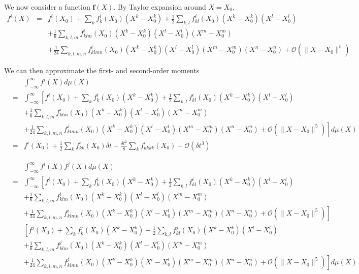 \documentclass[12pt]{article}
\begin{document}
We now consider a function $\mathbf{f}(X)$.
%
By Taylor expansion around $X=X_0$,
\begin{eqnarray}
f^i(X) &=& 
f^i(X_0) 
+ \sum_k f^i_k(X_0)  (X^k-X^k_0) 
+\frac{1}{2} \sum_{k,l}  f^i_{kl} (X_0) (X^k-X_0^k) (X^l-X_0^l) \\
&& + \frac{1}{6} \sum_{k,l,m} f^i_{klm} (X_0) (X^k-X_0^k) (X^l-X_0^l) (X^m-X_0^m) \\
&& + \frac{1}{24} \sum_{k,l,m,n} f^i_{klmn} (X_0) (X^k-X_0^k) (X^l-X_0^l) (X^m-X_0^m) (X^n-X_0^n)
+ \mathcal{O}\left( \| X- X_0 \|^5 \right)
\end{eqnarray}

We can then approximate the first- and second-order moments 
\begin{eqnarray}
&&\int_{-\infty}^{\infty} f^i(X) d\mu(X) \\
&= & \int_{-\infty}^{\infty} \left[ f^i(X_0) + \sum_k f^i_k(X_0) (X^k-X_0^k)  + \frac{1}{2} \sum_{k,l} f^i_{kl}(X_0) (X^k-X_0^k) (X^l-X_0^l)  \right. \\
&& + \frac{1}{6} \sum_{k,l,m} f^i_{klm} (X_0) (X^k-X_0^k) (X^l-X_0^l) (X^m-X_0^m) \\
&& \left. + \frac{1}{24} \sum_{k,l,m,n} f^i_{klmn} (X_0) (X^k-X_0^k) (X^l-X_0^l) (X^m-X_0^m) (X^n-X_0^n)
+ \mathcal{O}\left( \| X- X_0 \|^5 \right) \right] d\mu(X) \\
&=& f^i(X_0) + \frac{1}{2} \sum_k f^i_{kk}(X_0) \delta t + \frac{\delta t^2}{8} \sum_{k} f^i_{kkkk} (X_0) + \mathcal{O} (\delta t^3 )
\end{eqnarray}

\begin{eqnarray}
&&\int_{-\infty}^{\infty} f^i(X) f^j(X) d\mu(X) \\
&= &
\int_{-\infty}^{\infty} \left[ f^i(X_0) + \sum_k f^i_k(X_0) (X^k-X_0^k)  + \frac{1}{2} \sum_{k,l} f^i_{kl}(X_0) (X^k-X_0^k) (X^l-X_0^l) \right. \\
&&  + \frac{1}{6} \sum_{k,l,m} f^i_{klm} (X_0) (X^k-X_0^k) (X^l-X_0^l) (X^m-X_0^m) \\
&& \left. + \frac{1}{24} \sum_{k,l,m,n} f^i_{klmn} (X_0) (X^k-X_0^k) (X^l-X_0^l) (X^m-X_0^m) (X^n-X_0^n)
+ \mathcal{O}\left( \| X- X_0 \|^5 \right) \right]  \\
&& \left[ f^j(X_0) + \sum_k f^j_k(X_0) (X^k-X_0^k)  + \frac{1}{2} \sum_{k,l} f^j_{kl}(X_0) (X^k-X_0^k) (X^l-X_0^l)  \right. \\
&&  + \frac{1}{6} \sum_{k,l,m} f^j_{klm} (X_0) (X^k-X_0^k) (X^l-X_0^l) (X^m-X_0^m)  \\
&&  \left. + \frac{1}{24} \sum_{k,l,m,n} f^j_{klmn} (X_0) (X^k-X_0^k) (X^l-X_0^l) (X^m-X_0^m) (X^n-X_0^n)
+ \mathcal{O}\left( \| X- X_0 \|^5 \right) \right]  d\mu(X) 
\end{eqnarray}
\end{document}
